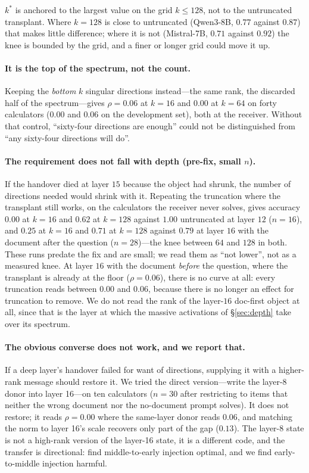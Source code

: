 \documentclass{article}
\begin{document}
$k^{*}$ is anchored to the largest value on the grid $k \le 128$, not to the
untruncated transplant. Where $k=128$ is close to untruncated (Qwen3-8B, $0.77$
against $0.87$) that makes little difference; where it is not (Mistral-7B,
$0.71$ against $0.92$) the knee is bounded by the grid, and a finer or longer
grid could move it up.

\paragraph{It is the top of the spectrum, not the count.} Keeping the
\emph{bottom} $k$ singular directions instead---the same rank, the discarded
half of the spectrum---gives $\rho = 0.06$ at $k=16$ and $0.00$ at $k=64$ on
forty calculators ($0.00$ and $0.06$ on the development set), both at the
receiver. Without that control, ``sixty-four directions are enough'' could not
be distinguished from ``any sixty-four directions will do''.

\paragraph{The requirement does not fall with depth (pre-fix, small $n$).} If
the handover died at layer $15$ because the object had shrunk, the number of
directions needed would shrink with it. Repeating the truncation where the
transplant still works, on the calculators the receiver never solves, gives
accuracy $0.00$ at $k=16$ and $0.62$ at $k=128$ against $1.00$ untruncated at
layer $12$ ($n=16$), and $0.25$ at $k=16$ and $0.71$ at $k=128$ against $0.79$ at
layer $16$ with the document after the question ($n=28$)---the knee between $64$
and $128$ in both. These runs predate the fix and are small; we read them as
``not lower'', not as a measured knee. At layer $16$ with the document \emph{before} the question, where the
transplant is already at the floor ($\rho=0.06$), there is no curve at all:
every truncation reads between $0.00$ and $0.06$, because there is no longer an
effect for truncation to remove. We do not read the rank of the layer-$16$
doc-first object at all, since that is the layer at which the massive
activations of \S\ref{sec:depth} take over its spectrum.



\paragraph{The obvious converse does not work, and we report that.} If a deep
layer's handover failed for want of directions, supplying it with a higher-rank
message should restore it. We tried the direct version---write the layer-8
donor into layer 16---on ten calculators ($n=30$ after restricting to items that
neither the wrong document nor the no-document prompt solves). It does not
restore; it reads $\rho = 0.00$ where the same-layer donor reads $0.06$,
and matching the norm to layer 16's scale recovers only part of the gap
($0.13$). The layer-8 state is not a high-rank version of the layer-16 state, it
is a different code, and the transfer is directional:
\citet{ardoin2026promptcompression} find middle-to-early injection optimal, and
we find early-to-middle injection harmful.
\end{document}
